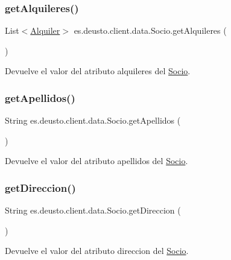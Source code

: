 \subsubsection{\texorpdfstring{getAlquileres()}{getAlquileres()}}
{\footnotesize\ttfamily List$<$\mbox{\hyperlink{classes_1_1deusto_1_1client_1_1data_1_1_alquiler}{Alquiler}}$>$ es.\+deusto.\+client.\+data.\+Socio.\+get\+Alquileres (\begin{DoxyParamCaption}{ }\end{DoxyParamCaption})}

Devuelve el valor del atributo alquileres del \mbox{\hyperlink{classes_1_1deusto_1_1client_1_1data_1_1_socio}{Socio}}. \mbox{\label{classes_1_1deusto_1_1client_1_1data_1_1_socio_a22bcd81f03f7349b71b40aef1e350b27}} 
\subsubsection{\texorpdfstring{getApellidos()}{getApellidos()}}
{\footnotesize\ttfamily String es.\+deusto.\+client.\+data.\+Socio.\+get\+Apellidos (\begin{DoxyParamCaption}{ }\end{DoxyParamCaption})}

Devuelve el valor del atributo apellidos del \mbox{\hyperlink{classes_1_1deusto_1_1client_1_1data_1_1_socio}{Socio}}. \mbox{\label{classes_1_1deusto_1_1client_1_1data_1_1_socio_a0d42844a1e3563fca08c7caa663f0e1f}} 
\subsubsection{\texorpdfstring{getDireccion()}{getDireccion()}}
{\footnotesize\ttfamily String es.\+deusto.\+client.\+data.\+Socio.\+get\+Direccion (\begin{DoxyParamCaption}{ }\end{DoxyParamCaption})}

Devuelve el valor del atributo direccion del \mbox{\hyperlink{classes_1_1deusto_1_1client_1_1data_1_1_socio}{Socio}}. \mbox{\label{classes_1_1deusto_1_1client_1_1data_1_1_socio_af011f597cc010b1c480ffbb586d98aa0}} 
